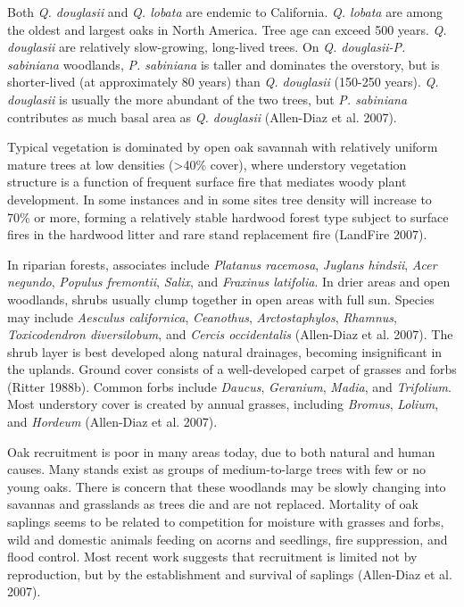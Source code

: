 Both \emph{Q. douglasii} and \emph{Q. lobata} are endemic to California. \emph{Q. lobata} are among the oldest and largest oaks in North America. Tree age can exceed 500 years. \emph{Q. douglasii} are relatively slow-growing, long-lived trees. On \emph{Q. douglasii-P. sabiniana} woodlands, \emph{P. sabiniana} is taller and dominates the overstory, but is shorter-lived (at approximately 80 years) than \emph{Q. douglasii} (150-250 years). \emph{Q. douglasii} is usually the more abundant of the two trees, but \emph{P. sabiniana} contributes as much basal area as \emph{Q. douglasii} (Allen-Diaz et al. 2007).

Typical vegetation is dominated by open oak savannah with relatively uniform mature trees at low densities (>40\% cover), where understory vegetation structure is a function of frequent surface fire that mediates woody plant development. In some instances and in some sites tree density will increase to 70\% or more, forming a relatively stable hardwood forest type subject to surface fires in the hardwood litter and rare stand replacement fire (LandFire 2007).

In riparian forests, associates include \emph{Platanus racemosa}, \emph{Juglans hindsii}, \emph{Acer negundo}, \emph{Populus fremontii}, \emph{Salix}, and \emph{Fraxinus latifolia}. In drier areas and open woodlands, shrubs usually clump together in open areas with full sun. Species may include \emph{Aesculus californica}, \emph{Ceanothus}, \emph{Arctostaphylos}, \emph{Rhamnus}, \emph{Toxicodendron diversilobum}, and \emph{Cercis occidentalis} (Allen-Diaz et al. 2007). The shrub layer is best developed along natural drainages, becoming insignificant in the uplands. Ground cover consists of a well-developed carpet of grasses and forbs (Ritter 1988b). Common forbs include \emph{Daucus}, \emph{Geranium}, \emph{Madia}, and \emph{Trifolium}. Most understory cover is created by annual grasses, including \emph{Bromus}, \emph{Lolium}, and \emph{Hordeum} (Allen-Diaz et al. 2007).

Oak recruitment is poor in many areas today, due to both natural and human causes. Many stands exist as groups of medium-to-large trees with few or no young oaks. There is concern that these woodlands may be slowly changing into savannas and grasslands as trees die and are not replaced. Mortality of oak saplings seems to be related to competition for moisture with grasses and forbs, wild and domestic animals feeding on acorns and seedlings, fire suppression, and flood control. Most recent work suggests that recruitment is limited not by reproduction, but by the establishment and survival of saplings (Allen-Diaz et al. 2007).


